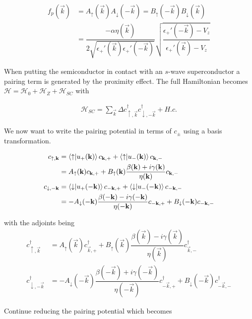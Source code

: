 \begin{align}
  f_p(\vec{k}) &= A_{\uparrow}(\vec{k})A_{\downarrow}(-\vec{k}) = B_{\uparrow}(-\vec{k})B_{\downarrow}(\vec{k}) \\
  &= \dfrac{-\alpha \eta(\vec{k})}{2\sqrt{\epsilon_+'(\vec{k})\epsilon_+'(-\vec{k})}} \sqrt{\dfrac{\epsilon_+'(-\vec{k})-V_z}{\epsilon_+'(\vec{k})-V_z}}
\end{align}

When putting the semiconductor in contact with an $s$-wave superconductor a pairing term is generated by the proximity effect. The full Hamiltonian becomes $\mathcal{H} = \mathcal{H}_0 + \mathcal{H}_Z + \mathcal{H}_{SC}$ with

\begin{align}
  \mathcal{H}_{SC} = \sum\limits_{\vec{k}} \Delta c_{\uparrow,\vec{k}}^\dagger c_{\downarrow,-\vec{k}}^\dagger + H.c.
\end{align}

We now want to write the pairing potential in terms of $c_{\pm}$ using a basis transformation.

\begin{align}
  c_{\uparrow,\mathbf{k}} &= \bra{\uparrow}\ket{u_+(\mathbf{k})} c_{\mathbf{k},+} + \bra{\uparrow}\ket{u_-(\mathbf{k})} c_{\mathbf{k},-} \\
  &= A_{\uparrow}(\mathbf{k}) c_{\mathbf{k},+} + B_{\uparrow}(\mathbf{k})\dfrac{\beta(\mathbf{k})+i\gamma(\mathbf{k})}{\eta(\mathbf{k})} c_{\mathbf{k},-} \\
  c_{\downarrow,-\mathbf{k}} &= \bra{\downarrow}\ket{u_+(-\mathbf{k})} c_{-\mathbf{k},+} + \bra{\downarrow}\ket{u_-(-\mathbf{k})} c_{-\mathbf{k},-} \\
  &= -A_{\downarrow}(-\mathbf{k})\dfrac{\beta(-\mathbf{k})-i\gamma(-\mathbf{k})}{\eta(-\mathbf{k})} c_{-\mathbf{k},+} + B_{\downarrow}(-\mathbf{k}) c_{-\mathbf{k},-}
\end{align}

with the adjoints being
\begin{align}
  c_{\uparrow,\vec{k}}^{\dagger} &= A_{\uparrow}(\vec{k}) c_{\vec{k},+}^{\dagger} + B_{\uparrow}(\vec{k})\dfrac{\beta(\vec{k})-i\gamma(\vec{k})}{\eta(\vec{k})} c_{\vec{k},-}^{\dagger} \\
  c_{\downarrow,-\vec{k}}^{\dagger} &= -A_{\downarrow}(-\vec{k})\dfrac{\beta(-\vec{k})+i\gamma(-\vec{k})}{\eta(-\vec{k})} c_{-\vec{k},+}^{\dagger} + B_{\downarrow}(-\vec{k}) c_{-\vec{k},-}^{\dagger}
\end{align}

Continue reducing the pairing potential which becomes

